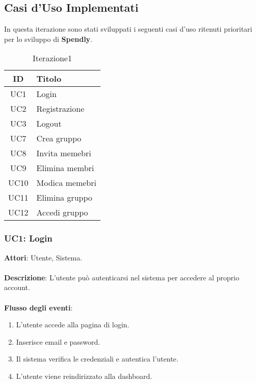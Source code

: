 \subsection{Casi d'Uso Implementati }

In questa iterazione sono stati sviluppati i seguenti casi d’uso ritenuti prioritari per lo sviluppo di \textbf{Spendly}.

\begin{table}[H]
    \centering
    \begin{tabular}{|c|l|}
    \hline
    \textbf{ID} & \textbf{Titolo} \\ \hline
    UC1 & Login\\ \hline
    UC2 & Registrazione \\ \hline
    UC3 & Logout \\ \hline
    UC7 & Crea gruppo \\ \hline
    UC8 & Invita memebri \\ \hline
    UC9 & Elimina membri \\ \hline
    UC10 & Modica memebri \\ \hline
    UC11 & Elimina gruppo \\ \hline
    UC12 & Accedi gruppo \\ \hline
    \end{tabular}
    \caption{Iterazione1}
\end{table}

\subsubsection{UC1: Login}
\textbf{Attori}: Utente, Sistema.
\\
\\
\textbf{Descrizione}: L'utente può autenticarsi nel sistema per accedere al proprio account.
\\
\\
\textbf{Flusso degli eventi}:
\begin{enumerate}
    \item L'utente accede alla pagina di login.
    \item Inserisce email e password.
    \item Il sistema verifica le credenziali e autentica l'utente.
    \item L'utente viene reindirizzato alla dashboard.
\end{enumerate}


